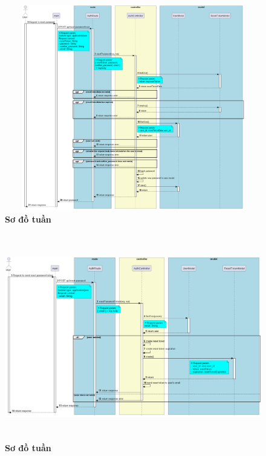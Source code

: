 \documentclass{article}%
\begin{document}
\begin{figure}[H]
  \centering
  \includegraphics[width=16cm,height=9cm]{Images/server/sequence/server/resetPassword.png}
  \caption[Sơ đồ tuần tự ]{\bfseries \fontsize{12pt}{0pt}
  \selectfont Sơ đồ tuần }
  \label{hinh21} %
\end{figure}

\begin{figure}[H]
  \centering
  \includegraphics[width=16cm,height=9cm]{Images/server/sequence/server/resetPasswordToken.png}
  \caption[Sơ đồ tuần tự ]{\bfseries \fontsize{12pt}{0pt}
  \selectfont Sơ đồ tuần }
  \label{hinh21} %
\end{figure}
\end{document}
